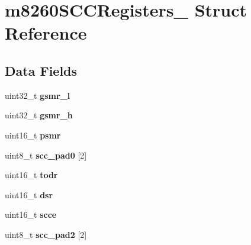 \hypertarget{structm8260SCCRegisters__}{}\section{m8260\+S\+C\+C\+Registers\+\_\+ Struct Reference}
\label{structm8260SCCRegisters__}
\subsection*{Data Fields}
\begin{DoxyCompactItemize}
\item 
\mbox{\label{structm8260SCCRegisters___a890ba73edd1b1b387cb07819f7bf3fde}} 
uint32\+\_\+t {\bfseries gsmr\+\_\+l}
\item 
\mbox{\label{structm8260SCCRegisters___a91d3aa037e24c47856f8ecf46f1c78fa}} 
uint32\+\_\+t {\bfseries gsmr\+\_\+h}
\item 
\mbox{\label{structm8260SCCRegisters___aecae4335fa7f53abbb888d0fbc9e5921}} 
uint16\+\_\+t {\bfseries psmr}
\item 
\mbox{\label{structm8260SCCRegisters___af9159e47f4f526a05eafee5d08eb3ca6}} 
uint8\+\_\+t {\bfseries scc\+\_\+pad0} \mbox{[}2\mbox{]}
\item 
\mbox{\label{structm8260SCCRegisters___ad92b5094e923eb17b56ba46fd644c500}} 
uint16\+\_\+t {\bfseries todr}
\item 
\mbox{\label{structm8260SCCRegisters___a050a633a13ce110c41c29b6301f73512}} 
uint16\+\_\+t {\bfseries dsr}
\item 
\mbox{\label{structm8260SCCRegisters___a181f79f3600914362d266f589b276782}} 
uint16\+\_\+t {\bfseries scce}
\item 
\mbox{\label{structm8260SCCRegisters___a2976e3d47509ad4e5a8f77ca7341ee67}} 
uint8\+\_\+t {\bfseries scc\+\_\+pad2} \mbox{[}2\mbox{]}
\item 
\mbox{\label{structm8260SCCRegisters___a18e65431d0e33b75d9cd3ad53eb9dfba}} 

\end{DoxyCompactItemize}
